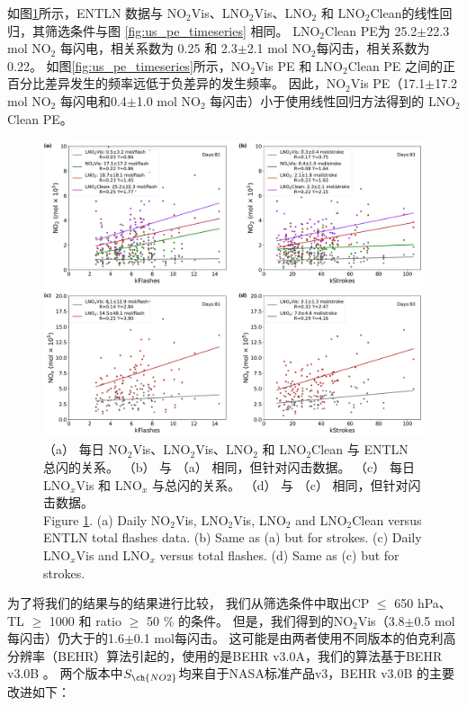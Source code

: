 如图\ref{fig:us_pe_linear}所示，ENTLN 数据与 NO$_2$Vis、LNO$_2$Vis、LNO$_2$ 和 LNO$_2$Clean的线性回归，其筛选条件与图 \ref{fig:us_pe_timeseries} 相同。
LNO$_2$Clean PE为 25.2$\pm$22.3 mol NO$_2$ 每闪电，相关系数为 0.25 和 2.3$\pm$2.1 mol NO$_2$每闪击，相关系数为 0.22。
如图\ref{fig:us_pe_timeseries}所示，NO$_2$Vis PE 和 LNO$_2$Clean PE 之间的正百分比差异发生的频率远低于负差异的发生频率。
因此，NO$_2$Vis PE（17.1$\pm$17.2 mol NO$_2$ 每闪电和0.4$\pm$1.0 mol NO$_2$ 每闪击）小于使用线性回归方法得到的 LNO$_2$Clean PE。

\begin{figure}[!htbp]
    \includegraphics[width=15cm]{./figures/us_pe_linear.pdf}
    \caption{（a） 每日 NO$_2$Vis、LNO$_2$Vis、LNO$_2$ 和 LNO$_2$Clean 与 ENTLN 总闪的关系。
    （b） 与 （a） 相同，但针对闪击数据。
    （c） 每日 LNO$_x$Vis 和 LNO$_x$ 与总闪的关系。
    （d） 与 （c） 相同，但针对闪击数据。\\
    Figure \ref{fig:us_pe_linear}. (a) Daily NO$_2$Vis, LNO$_2$Vis, LNO$_2$ and LNO$_2$Clean versus ENTLN total flashes data.
    (b) Same as (a) but for strokes. (c) Daily LNO$_x$Vis and LNO$_x$ versus total flashes. (d) Same as (c) but for strokes.}
    \label{fig:us_pe_linear}
\end{figure}

为了将我们的结果与\citet{Lapierre.2020}的结果进行比较，
我们从筛选条件中取出CP $\leq$ 650 hPa、TL $\geq$ 1000 和 ratio $\geq$ 50 \% 的条件。
但是，我们得到的NO$_2$Vis（3.8$\pm$0.5 mol每闪击）仍大于\citet{Lapierre.2020}的1.6$\pm$0.1 mol每闪击。
这可能是由两者使用不同版本的伯克利高分辨率（BEHR）算法引起的，\citet{Lapierre.2020}使用的是BEHR v3.0A，我们的算法基于BEHR v3.0B \citep{Laughner.2019a}。
两个版本中$S_{\ch{NO2}}$均来自于NASA标准产品v3，BEHR v3.0B 的主要改进如下：

